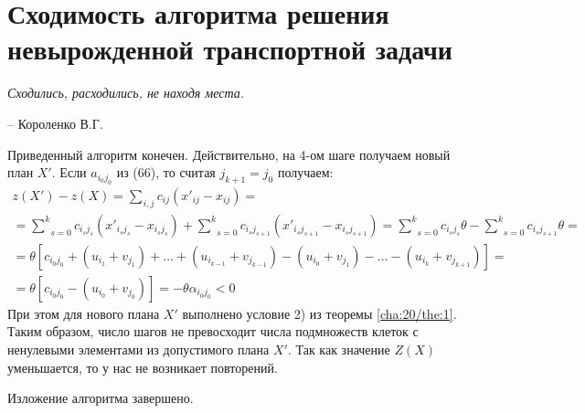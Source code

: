 \chapter{Сходимость алгоритма решения невырожденной транспортной задачи}
\label{cha:25}

\epigraph{
	\textit{Сходились, расходились, не находя места.}}
{-- Короленко В.Г.}

Приведенный алгоритм конечен. Действительно, на 4-ом шаге получаем новый план $X'$. Если $a_{i_0j_0}$ из (66), то считая $j_{k+1} = j_0$ получаем:
$$\begin{gathered}
	z(X') - z(X) = \underset{i, j}{\overset{}{\sum}}c_{ij} (x'_{ij} - x_{ij}) = \\
	= \underset{s=0}{\overset{k}{\sum}}c_{i_s j_s} (x'_{i_s j_s} - x_{i_s j_s}) + \underset{s=0}{\overset{k}{\sum}}c_{i_s j_{s+1}} (x'_{i_s j_{s+1}} - x_{i_s j_{s+1}}) = \underset{s=0}{\overset{k}{\sum}}c_{i_s j_s} \theta - \underset{s=0}{\overset{k}{\sum}}c_{i_s j_{s+1}} \theta = \\
	= \theta \left[ c_{i_0 j_0} + (u_{i_1} + v_{j_1}) + \dots + (u_{i_{k-1}} + v_{j_{k-1}}) - (u_{i_0} + v_{j_1}) - \dots - (u_{i_k} + v_{j_{k+1}}) \right] = \\
	= \theta [c_{i_0 j_0} - (u_{i_0} + v_{j_0})] = - \theta \alpha_{i_0 j_0} < 0
\end{gathered}$$
При этом для нового плана $X'$ выполнено условие 2) из теоремы \ref{cha:20/the:1}. Таким образом, число шагов не превосходит числа подмножеств клеток с ненулевыми элементами из допустимого плана $X'$. Так как значение $Z(X)$ уменьшается, то у нас не возникает повторений.

Изложение алгоритма завершено.